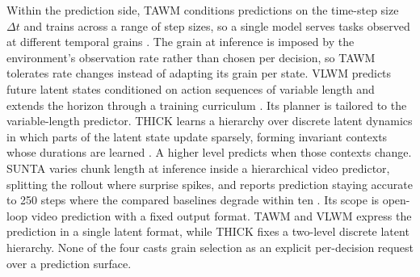Within the prediction side, TAWM conditions predictions on the time-step size $\Delta t$ and trains across a range of step sizes, so a single model serves tasks observed at different temporal grains \citep{nhu2025tawm}. The grain at inference is imposed by the environment's observation rate rather than chosen per decision, so TAWM tolerates rate changes instead of adapting its grain per state. VLWM predicts future latent states conditioned on action sequences of variable length and extends the horizon through a training curriculum \citep{du2026vlwm}. Its planner is tailored to the variable-length predictor. THICK learns a hierarchy over discrete latent dynamics in which parts of the latent state update sparsely, forming invariant contexts whose durations are learned \citep{gumbsch2024thick}. A higher level predicts when those contexts change. SUNTA varies chunk length at inference inside a hierarchical video predictor, splitting the rollout where surprise spikes, and reports prediction staying accurate to 250 steps where the compared baselines degrade within ten \citep{iiyama2026sunta}. Its scope is open-loop video prediction with a fixed output format. TAWM and VLWM express the prediction in a single latent format, while THICK fixes a two-level discrete latent hierarchy. None of the four casts grain selection as an explicit per-decision request over a prediction surface.

